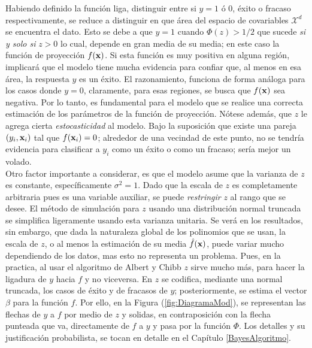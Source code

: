 \documentclass[../Main/Main.tex]{subfiles}
\begin{document}
Habiendo definido la función liga, distinguir entre si $y = 1$ ó 0, éxito o fracaso respectivamente, se reduce a distinguir en que área del espacio de covariables $\mathcal{X}^d$ se encuentra el dato. Esto se debe a que $y = 1$ cuando $\Phi(z) > 1/2$ que sucede \textit{si y solo si} $z>0$ lo cual, depende en gran media de su media; en este caso la función de proyección $f(\mathbf{x})$. Si esta función es muy positiva en alguna región, implicará que el modelo tiene mucha evidencia para confiar que, al menos en esa área, la respuesta $y$ es un éxito. El razonamiento, funciona de forma análoga para los casos donde $y = 0$, claramente, para esas regiones, se busca que $f(\mathbf{x})$ sea negativa. Por lo tanto, es fundamental para el modelo que se realice una correcta estimación de los parámetros de la función de proyección.  Nótese además, que $z$ le agrega cierta \textit{estocasticidad} al modelo. Bajo la suposición que existe una pareja $(y_i,\mathbf{x}_i)$ tal que $f(\mathbf{x}_i) = 0$; alrededor de una vecindad de este punto, no se tendría evidencia para clasificar a $y_i$ como un éxito o como un fracaso; sería mejor un volado.\\ 

Otro factor importante a considerar, es que el modelo asume que la varianza de $z$ es constante, específicamente $\sigma^2 = 1$. Dado que la escala de $z$ es completamente arbitraria pues es una variable auxiliar, se puede \textit{restringir} $z$ al rango que se desee. El método de simulación para $z$ usando una distribución normal truncada se simplifica ligeramente usando esta varianza unitaria. Se verá en los resultados, sin embargo, que dada la naturaleza global de los polinomios que se usan, la escala de $z$, o al menos la estimación de su media $\hat{f}(\mathbf{x})$, puede variar mucho dependiendo de los datos, mas esto no representa un problema. Pues, en la practica, al  usar el algoritmo de Albert y Chibb $z$ sirve mucho más, para hacer la ligadura de $y$ hacia $f$ y no viceversa. En $z$ se codifica, mediante una normal truncada, los casos de éxito y de fracasos de $y$; posteriormente, se estima el vector $\beta$ para la función $f$. Por ello, en la Figura (\ref{fig:DiagramaMod}), se representan las flechas de $y$ a $f$ por medio de $z$ y solidas, en contraposición con la flecha punteada que va, directamente de $f$ a $y$ y pasa por la función $\Phi$. Los detalles y su justificación probabilista, se tocan en detalle en el Capítulo \ref{BayesAlgoritmo}.\\
\end{document}
